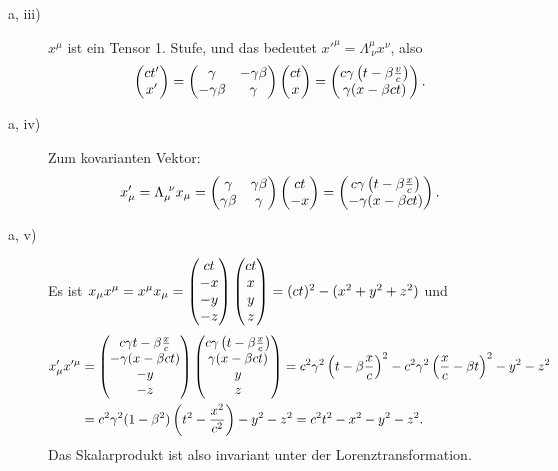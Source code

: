 \begin{description}
	\item[a, iii)] $x^\mu$ ist ein Tensor 1. Stufe, und das bedeutet $x'^\mu = \Lambda^\mu_{~\nu} x^\nu$, also 
	\[
		\begin{pmatrix} c t' \\ x' \end{pmatrix} = \begin{pmatrix}
			\gamma & - \gamma \beta \\
			- \gamma \beta & \gamma
		\end{pmatrix} \begin{pmatrix} ct \\ x \end{pmatrix}
		= \begin{pmatrix}
			c \gamma \left( t - \beta \frac{v}{c} \right) \\
			\gamma (x - \beta c t) 
		\end{pmatrix}
		\text{.}
	\]

	\item[a, iv)] Zum kovarianten Vektor: 
	\[
		x'_\mu 
		= \Lambda_\mu^{~\nu} x_\mu 
		= \begin{pmatrix}
			\gamma & \gamma \beta \\
			\gamma \beta & \gamma
		\end{pmatrix} \begin{pmatrix} ct \\ -x \end{pmatrix}
		= \begin{pmatrix} c \gamma \left( t - \beta \frac{x}{c} \right) \\ - \gamma (x - \beta c t) \end{pmatrix}
		\text{.}
	\] 
	
	\item[a, v)] Es ist $x_\mu x^\mu = x^\mu x_\mu = \begin{pmatrix} ct \\ -x \\ -y \\ -z \end{pmatrix} \begin{pmatrix} ct \\ x \\ y \\ z \end{pmatrix} = (ct)^2 - (x^2 + y^2 + z^2)$ und 
	\begin{align*}
		x'_\mu x'^\mu 
		&= \begin{pmatrix}  c \gamma t - \beta \frac{x}{c} \\ - \gamma (x - \beta c t) \\ -y \\ -z \end{pmatrix} \begin{pmatrix}  c \gamma \left( t - \beta \frac{x}{c} \right) \\ \gamma (x - \beta c t) \\ y \\ z \end{pmatrix}
		= c^2 \gamma^2 \left( t - \beta \frac{x}{c} \right)^2 - c^2 \gamma^2 \left( \frac{x}{c} - \beta t \right)^2 - y^2 - z^2 \\
		&= c^2 \gamma^2 (1 - \beta^2) \left( t^2 - \frac{x^2}{c^2} \right) - y^2 - z^2
		= c^2 t^2 - x^2 - y^2 - z^2
		\text{.}
	\end{align*}
	Das Skalarprodukt ist also invariant unter der Lorenztransformation.
	

\end{description}
